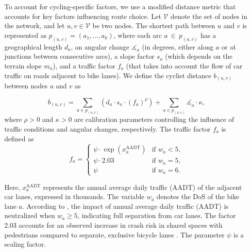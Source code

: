 \documentclass[letterpaper, 10 pt, conference]{ieeeconf}  %
\begin{document}
To account for cycling-specific factors, we use a modified distance metric that accounts for key factors influencing route choice. Let $\mathcal{V}$ denote the set of nodes in the network, and let $u, v \in \mathcal{V}$ be two nodes. The shortest path between $u$ and $v$ is represented as $p_{(u,v)} = (a_{1},\ldots, a_{k})$, where each arc $a~\in~p_{(u,v)}$ has a geographical length $d_{a}$, an angular change $\measuredangle_a$ (in degrees, either along $a$ or at junctions between consecutive arcs), a slope factor $s_{a}$ (which depends on the terrain slope $m_{a}$), and a traffic factor $f_{a}$ (that takes into account the flow of car traffic on roads adjacent to bike lanes). We define the cyclist distance $b_{(u,v)}$ between nodes $u$ and $v$ as

\begin{equation}
\label{cyclist_distance}
    b_{(u,v)} = \sum_{a \in p_{(u,v)}} \left( d_a \cdot s_a \cdot (f_a)^{\rho} \right) +  \sum_{a \in p_{(u,v)}} \measuredangle_a \cdot \kappa,
\end{equation}
where $\rho > 0$ and $\kappa > 0$ are calibration parameters controlling the influence of traffic conditions and angular changes, respectively.
The traffic factor $f_a$ is defined as
\begin{equation}
\label{f_a}
f_a = 
     \begin{cases}
\psi \cdot \exp{\left( x^{\text{AADT}}_{a} \right)} & \text{if } w_a < 5, \\
\psi \cdot 2.03 & \text{if } w_a = 5, \\
\psi & \text{if } w_a = 6.
\end{cases}
\end{equation}

Here, $x^{\text{AADT}}_{a}$ represents the annual average daily traffic (AADT) of the adjacent car lanes, expressed in thousands. The variable $w_a$ denotes the DoS of the bike lane $a$. According to \cite{cyclerap2024}, the impact of annual average daily traffic (AADT) is neutralized when $w_a \geq 5$, indicating full separation from car lanes. The factor 2.03 accounts for an observed increase in crash risk in shared spaces with pedestrians compared to separate, exclusive bicycle lanes \cite{mesimaki2021near}. The parameter $\psi$ is a scaling factor.  



\end{document}
